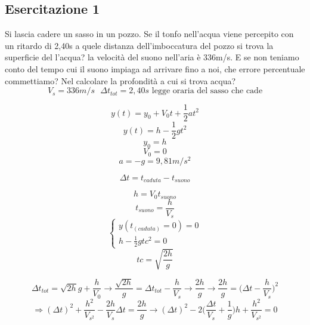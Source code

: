 \documentclass{book}
\begin{document}
\subsection{Esercitazione 1}
Si lascia cadere un sasso in un pozzo. Se il tonfo nell'acqua viene percepito con un ritardo di 2,40s a quele distanza dell'imboccatura del pozzo si trova la superficie del l'acqua? la velocità del suono nell'aria è 336m/s. E se non teniamo conto del tempo cui il suono impiaga ad arrivare fino a noi, che errore percentuale commettiamo? Nel calcolare la profondità a cui si trova acqua?
\begin{equation*}
	V_{s}=336m/s\text{ } \Delta t_{tot}=2,40s \text{ legge oraria del sasso che cade}
\end{equation*}
\begin{multicols}{2}
	\begin{equation*}
		y(t)=y_0+V_0t+\frac{1}{2}at^2
	\end{equation*}
	\begin{equation*}
		y(t)=h-\frac{1}{2}gt^2
	\end{equation*}
	\begin{equation*}
		y_0=h
	\end{equation*}
	\begin{equation*}
		V_0=0
	\end{equation*}
	\begin{equation*}
		a=-g=9,81m/s^2
	\end{equation*}
\end{multicols}
\begin{equation*}
	\Delta t=t_{caduta}-t_{suono}
\end{equation*}
\begin{multicols}{2}
	\begin{equation*}
		h=V_0t_{suono}
	\end{equation*}
	\begin{equation*}
		t_{suono}=\frac{h}{V_s}
	\end{equation*}
	\begin{equation*}
		\begin{cases}
			y(t_{(caduta)}=0)=0 \\
			h-\frac{1}{2}gtc^2=0
		\end{cases}
	\end{equation*}
	\begin{equation*}
		tc=\sqrt{\frac{2h}{g}}
	\end{equation*}
\end{multicols}
\begin{equation*}
	\Delta t_{tot}=\sqrt{2h}{g}+\frac{h}{V_0}\to \frac{\sqrt{2h}}{g}=\Delta t_{tot} - \frac{h}{V_s}\to \frac{2h}{g}\to \frac{2h}{g}=\bigg(\Delta t-\frac{h}{V_s}\bigg)^2
\end{equation*}
\begin{equation*}
	\Rightarrow (\Delta t)^2+\frac{h^2}{V_{s^2}} -\frac{2h}{V_s}\Delta t=\frac{2h}{g}\to (\Delta t)^2-2 \bigg(\frac{\Delta t}{V_s}+\frac{1}{g}\bigg) h+\frac{h^2}{V_{s^2}} =0 
\end{equation*}
\end{document}
